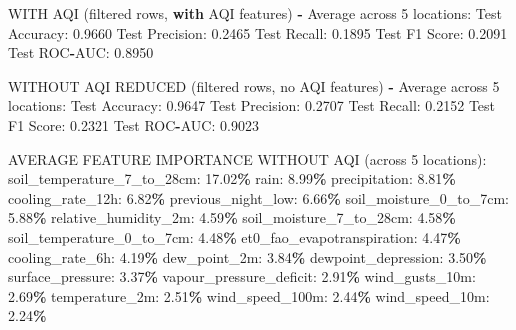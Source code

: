 \documentclass[
  letterpaper,
  DIV=11,
  numbers=noendperiod]{scrartcl}
\newenvironment{Shaded}{\begin{snugshade}}{\end{snugshade}}
\newcommand{\ControlFlowTok}[1]{\textcolor[rgb]{0.13,0.29,0.53}{\textbf{#1}}}
\newcommand{\DecValTok}[1]{\textcolor[rgb]{0.00,0.00,0.81}{#1}}
\newcommand{\FloatTok}[1]{\textcolor[rgb]{0.00,0.00,0.81}{#1}}
\newcommand{\NormalTok}[1]{#1}
\newcommand{\OperatorTok}[1]{\textcolor[rgb]{0.81,0.36,0.00}{\textbf{#1}}}
\begin{document}
\begin{Shaded}
\begin{Highlighting}[]
\NormalTok{WITH AQI (filtered rows, }\ControlFlowTok{with}\NormalTok{ AQI features) }\OperatorTok{{-}}\NormalTok{ Average across }\DecValTok{5}\NormalTok{ locations:}
\NormalTok{  Test Accuracy: }\FloatTok{0.9660}
\NormalTok{  Test Precision: }\FloatTok{0.2465}
\NormalTok{  Test Recall: }\FloatTok{0.1895}
\NormalTok{  Test F1 Score: }\FloatTok{0.2091}
\NormalTok{  Test ROC}\OperatorTok{{-}}\NormalTok{AUC: }\FloatTok{0.8950}

\NormalTok{WITHOUT AQI REDUCED (filtered rows, no AQI features) }\OperatorTok{{-}}\NormalTok{ Average across }\DecValTok{5}\NormalTok{ locations:}
\NormalTok{  Test Accuracy: }\FloatTok{0.9647}
\NormalTok{  Test Precision: }\FloatTok{0.2707}
\NormalTok{  Test Recall: }\FloatTok{0.2152}
\NormalTok{  Test F1 Score: }\FloatTok{0.2321}
\NormalTok{  Test ROC}\OperatorTok{{-}}\NormalTok{AUC: }\FloatTok{0.9023}

\NormalTok{AVERAGE FEATURE IMPORTANCE WITHOUT AQI (across }\DecValTok{5}\NormalTok{ locations):}
\NormalTok{  soil\_temperature\_7\_to\_28cm: }\FloatTok{17.02}\OperatorTok{\%}
\NormalTok{  rain: }\FloatTok{8.99}\OperatorTok{\%}
\NormalTok{  precipitation: }\FloatTok{8.81}\OperatorTok{\%}
\NormalTok{  cooling\_rate\_12h: }\FloatTok{6.82}\OperatorTok{\%}
\NormalTok{  previous\_night\_low: }\FloatTok{6.66}\OperatorTok{\%}
\NormalTok{  soil\_moisture\_0\_to\_7cm: }\FloatTok{5.88}\OperatorTok{\%}
\NormalTok{  relative\_humidity\_2m: }\FloatTok{4.59}\OperatorTok{\%}
\NormalTok{  soil\_moisture\_7\_to\_28cm: }\FloatTok{4.58}\OperatorTok{\%}
\NormalTok{  soil\_temperature\_0\_to\_7cm: }\FloatTok{4.48}\OperatorTok{\%}
\NormalTok{  et0\_fao\_evapotranspiration: }\FloatTok{4.47}\OperatorTok{\%}
\NormalTok{  cooling\_rate\_6h: }\FloatTok{4.19}\OperatorTok{\%}
\NormalTok{  dew\_point\_2m: }\FloatTok{3.84}\OperatorTok{\%}
\NormalTok{  dewpoint\_depression: }\FloatTok{3.50}\OperatorTok{\%}
\NormalTok{  surface\_pressure: }\FloatTok{3.37}\OperatorTok{\%}
\NormalTok{  vapour\_pressure\_deficit: }\FloatTok{2.91}\OperatorTok{\%}
\NormalTok{  wind\_gusts\_10m: }\FloatTok{2.69}\OperatorTok{\%}
\NormalTok{  temperature\_2m: }\FloatTok{2.51}\OperatorTok{\%}
\NormalTok{  wind\_speed\_100m: }\FloatTok{2.44}\OperatorTok{\%}
\NormalTok{  wind\_speed\_10m: }\FloatTok{2.24}\OperatorTok{\%}


\end{Highlighting}
\end{Shaded}
\end{document}
